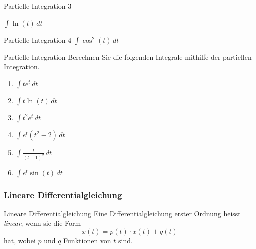 \begin{bsp}{Partielle Integration 3}{}

    \(\int \ln(t)\,dt\)

    \vspace{3cm}
\end{bsp}


\begin{bsp}{Partielle Integration 4}{}
    \(        \int \cos^2(t)\,dt\)

    \vspace{14cm}
\end{bsp}

\clearpage
\begin{ueb}{Partielle Integration}{}
    Berechnen Sie die folgenden Integrale mithilfe
    der partiellen Integration.

    \begin{enumerate}
        \item \(\displaystyle \int t e^t\,dt\)

        \item \(\displaystyle \int t\ln(t)\,dt\)

        \item \(\displaystyle \int t^2 e^t\,dt\)

        \item \(\displaystyle \int e^t(t^2-2)\,dt\)

        \item \(\displaystyle \int \frac{t}{(t+1)^2}\,dt\)

        \item \(\displaystyle \int e^t\sin(t)\,dt\)
    \end{enumerate}
\end{ueb}


















\clearpage

\subsubsection{Lineare Differentialgleichung}

\begin{definition}{Lineare Differentialgleichung}{}
    Eine Differentialgleichung erster Ordnung heisst
    \emph{linear}, wenn sie die Form
    \[
        \dot{x}(t)=p(t)\cdot x(t)+q(t)
    \]
    hat, wobei \(p\) und \(q\) Funktionen von \(t\) sind.
\end{definition}

